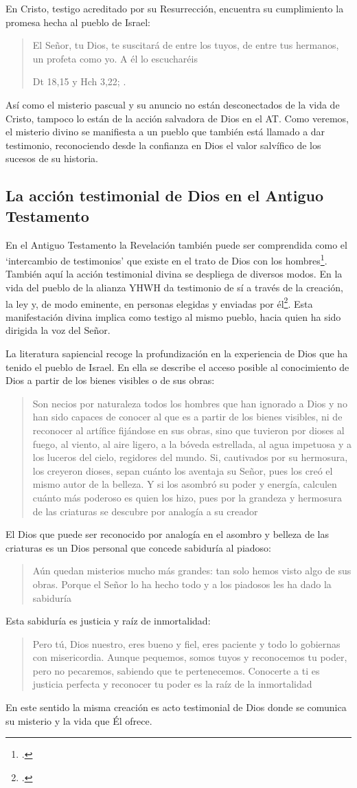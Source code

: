 En Cristo, testigo acreditado por su Resurrección, encuentra su cumplimiento la promesa hecha al pueblo de Israel: \blockquote[Dt 18,15 y Hch 3,22; {\Cite[Cf.][24-29]{ratzinger2007jdenaz}}.]{El Señor, tu Dios, te suscitará de entre los tuyos, de entre tus hermanos, un profeta como yo. A él lo escucharéis}. Así como el misterio pascual y su anuncio no están desconectados de la vida de Cristo, tampoco lo están de la acción salvadora de Dios en el AT. Como veremos, el misterio divino se manifiesta a un pueblo que también está llamado a dar testimonio, reconociendo desde la confianza en Dios el valor salvífico de los sucesos de su historia.

\subsection{La acción testimonial de Dios en el Antiguo Testamento}

En el Antiguo Testamento la Revelación también puede ser comprendida como el `intercambio de testimonios' que existe en el trato de Dios con los hombres\footcite[Cf.][1530]{latourelle2000testimonio}. También aquí la acción testimonial divina se despliega de diversos modos. En la vida del pueblo de la alianza YHWH da testimonio de sí a través de la creación, la ley y, de modo eminente, en personas elegidas y enviadas por él\footcite[Cf.][114-115]{prades2015testimonio}. Esta manifestación divina implica como testigo al mismo pueblo, hacia quien ha sido dirigida la voz del Señor.

La literatura sapiencial recoge la profundización en la experiencia de Dios que ha tenido el pueblo de Israel. En ella se describe el acceso posible al conocimiento de Dios a partir de los bienes visibles o de sus obras: \blockquote[][\,(Sab 13,1-5)]{Son necios por naturaleza todos los hombres que han ignorado a Dios y no han sido capaces de conocer al que es a partir de los bienes visibles, ni de reconocer al artífice fijándose en sus obras, sino que tuvieron por dioses al fuego, al viento, al aire ligero, a la bóveda estrellada, al agua impetuosa y a los luceros del cielo, regidores del mundo. Si, cautivados por su hermosura, los creyeron dioses, sepan cuánto los aventaja su Señor, pues los creó el mismo autor de la belleza. Y si los asombró su poder y energía, calculen cuánto más poderoso es quien los hizo, pues por la grandeza y hermosura de las criaturas se descubre por analogía a su creador}.

El Dios que puede ser reconocido por analogía en el asombro y belleza de las criaturas es un Dios personal que concede sabiduría al piadoso: \blockquote[][\,(Eclo 43,32-3)]{Aún quedan misterios mucho más grandes: tan solo hemos visto algo de sus obras. Porque el Señor lo ha hecho todo y a los piadosos les ha dado la sabiduría}. Esta sabiduría es justicia y raíz de inmortalidad: \blockquote[][\,(Sab 15,1-3)]{Pero tú, Dios nuestro, eres bueno y fiel, eres paciente y todo lo gobiernas con misericordia. Aunque pequemos, somos tuyos y reconocemos tu poder, pero no pecaremos, sabiendo que te pertenecemos. Conocerte a ti es justicia perfecta y reconocer tu poder es la raíz de la inmortalidad}. En este sentido la misma creación es acto testimonial de Dios donde se comunica su misterio y la vida que Él ofrece.

